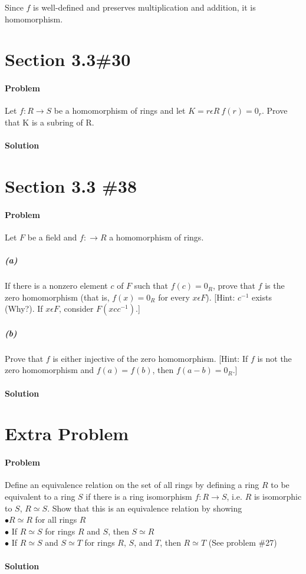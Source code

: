 \documentclass[a4paper,11pt]{article}
\begin{document}
Since $f$ is well-defined and preserves multiplication and addition, it is homomorphism.


\section{Section 3.3\#30}
\paragraph{Problem}
Let $f:R\rightarrow S$ be a homomorphism of rings and let $K = {r\epsilon R \: f(r) = 0_r}$.
Prove that K is a subring of R.
\paragraph{Solution}

\section{Section 3.3 \#38}
\paragraph{Problem}
Let $F$ be a field and $f: \rightarrow R$ a homomorphism of rings.
\subparagraph{(a)}
If there is a nonzero element $c$ of $F$ such that $f(c) = 0_R$, prove that $f$ is the zero homomorphism (that is, $f(x) = 0_R$ for every $x \epsilon F$). [Hint: $c^{-1}$ exists (Why?). If $x \epsilon F$, consider $F(xcc^{-1})$.]
\subparagraph{(b)}
Prove that $f$ is either injective of the zero homomorphism. [Hint: If $f$ is not the zero homomorphism and $f(a)= f(b)$, then $f(a-b) = 0_R$.]

\paragraph{Solution}

\section{Extra Problem}
\paragraph{Problem}
Define an equivalence relation on the set of all rings by defining a ring $R$ to be equivalent to a ring $S$ if there is a ring isomorphism $f: R \rightarrow S$, i.e. $R$ is isomorphic to $S$, $R \simeq S$. 
Show that this is an equivalence relation by showing\\
$\bullet R \simeq R$ for all rings $R$\\
$\bullet$ If $R \simeq S$ for rings $R$ and $S$, then $S \simeq R$\\
$\bullet$ If $R \simeq S$ and $S \simeq T$ for rings $R$, $S$, and $T$, then $R \simeq T$ (See problem \#27)

\paragraph{Solution}
\end{document}
